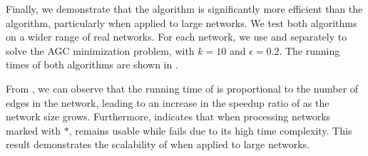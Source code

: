 \documentclass[10pt,twocolumn,twoside]{IEEEtran}
\begin{document}
Finally, we demonstrate that the  algorithm is significantly more efficient than the  algorithm, particularly when applied to large networks.
We test both algorithms on a wider range of real networks.
For each network, we use  and  separately to solve the AGC minimization problem, with \(k=10\) and \(\epsilon=0.2\).
The running times of both algorithms are shown in .

From , we can observe that the running time of  is proportional to the number of edges in the network, leading to an increase in the speedup ratio of  as the network size grows.
Furthermore,  indicates that when processing networks marked with \(\ast\),
 remains usable while  fails due to its high time complexity.
This result demonstrates the scalability of  when applied to large networks.
\end{document}
